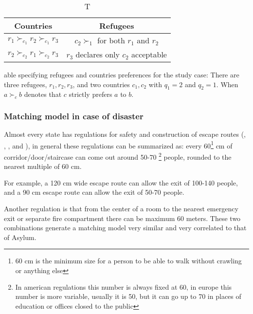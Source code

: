 \documentclass[letterpaper]{article} %
\begin{document}
\begin{table}[!htb]
    \begin{tabular}{c|c}
        \hline Countries & Refugees \\
        \hline\( r_{1} \succ_{c_{1}} r_{2} \succ_{c_{1}} r_{3} \) & \( c_{2} \succ_{1} \) for both \( r_{1} \) and \( r_{2} \) \\
        \( r_{2} \succ_{c_{2}} r_{1} \succ_{c_{2}} r_{3} \) & \( r_{3} \) declares only \( c_{2} \) acceptable \\
        \hline
    \end{tabular}
    \caption Table specifying refugees and countries preferences for
    the study case: There are three refugees, \( r _ { 1 } , r _ { 2 } , r _ { 3 } \), and two countries \( c _ { 1 } , c _ { 2 } \) with \( q _ { 1 } = 2 \) and \( q _ { 2 } = 1 \).
    When \( a \succ_{c} b \) denotes that \( c \) strictly prefers \( a \) to \( b \).
    \label{tab:countries-refugees}
\end{table}

\subsubsection{Matching model in case of disaster}

Almost every state has regulations for safety and construction of escape routes (\cite{it-81-2008},
\cite{uk-1541-2005}, \cite{usa-1910-1974}, \cite{cee-654-1989} and \cite{cee-567-1977}), in general these 
regulations can be summarized as: every 60\footnote{60 cm is the minimum size for a person to be 
able to walk without crawling or anything else} cm of corridor/door/staircase can come out around 50-70
\footnote{In american regulations this number is always fixed at 60, in europe this number is more 
variable, usually it is 50, but it can go up to 70 in places of education or offices closed to the public} 
people, rounded to the nearest multiple of 60 cm.

For example, a 120 cm wide escape route can allow the exit of 100-140 people, and a 90 cm 
escape route can allow the exit of 50-70 people.

Another regulation is that from the center of a room to the nearest emergency exit or separate 
fire compartment there can be maximum 60 meters. These two combinations generate a matching model 
very similar and very correlated to that of Asylum.
\end{document}
